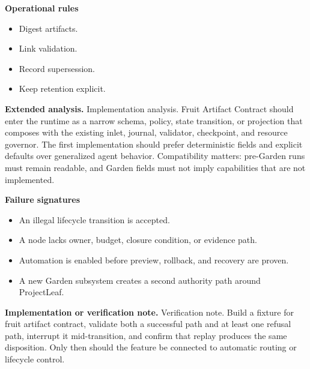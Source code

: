 \documentclass[10pt,letterpaper,oneside]{article}
\begin{document}
\textbf{Operational rules}
\begin{itemize}
\item Digest artifacts.
\item Link validation.
\item Record supersession.
\item Keep retention explicit.
\end{itemize}
\textbf{Extended analysis.} Implementation analysis. Fruit Artifact Contract should enter the runtime as a narrow schema, policy, state transition, or projection that composes with the existing inlet, journal, validator, checkpoint, and resource governor. The first implementation should prefer deterministic fields and explicit defaults over generalized agent behavior. Compatibility matters: pre-Garden runs must remain readable, and Garden fields must not imply capabilities that are not implemented.

\textbf{Failure signatures}
\begin{itemize}
\item An illegal lifecycle transition is accepted.
\item A node lacks owner, budget, closure condition, or evidence path.
\item Automation is enabled before preview, rollback, and recovery are proven.
\item A new Garden subsystem creates a second authority path around ProjectLeaf.
\end{itemize}
\textbf{Implementation or verification note.} Verification note. Build a fixture for fruit artifact contract, validate both a successful path and at least one refusal path, interrupt it mid-transition, and confirm that replay produces the same disposition. Only then should the feature be connected to automatic routing or lifecycle control.
\end{document}
